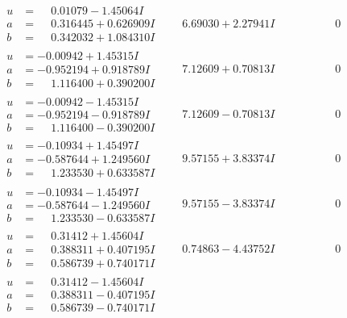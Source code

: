 \documentclass[1p]{elsarticle_modified}
\theoremstyle{definition}
\begin{document}
$$\begin{array}{c|c|c}
\begin{aligned}
u &= \phantom{-}0.01079 - 1.45064 I \\
a &= \phantom{-}0.316445 + 0.626909 I \\
b &= \phantom{-}0.342032 + 1.084310 I\end{aligned}
 & \phantom{-}6.69030 + 2.27941 I & \phantom{-0.000000 } 0 \\ \hline\begin{aligned}
u &= -0.00942 + 1.45315 I \\
a &= -0.952194 + 0.918789 I \\
b &= \phantom{-}1.116400 + 0.390200 I\end{aligned}
 & \phantom{-}7.12609 + 0.70813 I & \phantom{-0.000000 } 0 \\ \hline\begin{aligned}
u &= -0.00942 - 1.45315 I \\
a &= -0.952194 - 0.918789 I \\
b &= \phantom{-}1.116400 - 0.390200 I\end{aligned}
 & \phantom{-}7.12609 - 0.70813 I & \phantom{-0.000000 } 0 \\ \hline\begin{aligned}
u &= -0.10934 + 1.45497 I \\
a &= -0.587644 + 1.249560 I \\
b &= \phantom{-}1.233530 + 0.633587 I\end{aligned}
 & \phantom{-}9.57155 + 3.83374 I & \phantom{-0.000000 } 0 \\ \hline\begin{aligned}
u &= -0.10934 - 1.45497 I \\
a &= -0.587644 - 1.249560 I \\
b &= \phantom{-}1.233530 - 0.633587 I\end{aligned}
 & \phantom{-}9.57155 - 3.83374 I & \phantom{-0.000000 } 0 \\ \hline\begin{aligned}
u &= \phantom{-}0.31412 + 1.45604 I \\
a &= \phantom{-}0.388311 + 0.407195 I \\
b &= \phantom{-}0.586739 + 0.740171 I\end{aligned}
 & \phantom{-}0.74863 - 4.43752 I & \phantom{-0.000000 } 0 \\ \hline\begin{aligned}
u &= \phantom{-}0.31412 - 1.45604 I \\
a &= \phantom{-}0.388311 - 0.407195 I \\
b &= \phantom{-}0.586739 - 0.740171 I\end{aligned}

\end{array}$$
\end{document}
